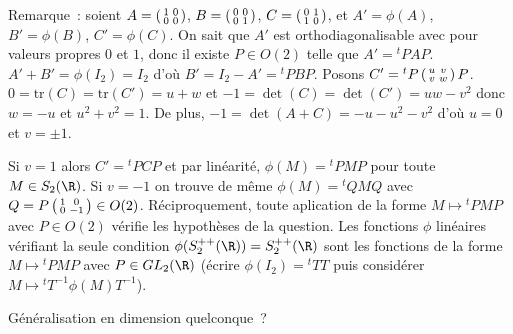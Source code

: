 {\begin{enumerate}
{    Remarque~: soient $A = \left(\begin{smallmatrix}1&0\cr0&0\cr\end{smallmatrix}\right)$,
                      $B = \left(\begin{smallmatrix}0&0\cr0&1\cr\end{smallmatrix}\right)$,
                      $C = \left(\begin{smallmatrix}0&1\cr1&0\cr\end{smallmatrix}\right)$,
    et $A'=\phi(A)$, $B'=\phi(B)$, $C'=\phi(C)$. On sait que $A'$ est
    orthodiagonalisable avec pour valeurs propres $0$ et $1$, donc il existe
    $P\in O(2)$ telle que $A' = {}^tPAP$. $A'+B'=\phi(I_2)=I_2$ d'où
    $B' = I_2-A' = {}^tPBP$. Posons $C' = {}^tP\left(\begin{smallmatrix}u&v\cr v&w\cr\end{smallmatrix}\right)P$.
    $0=\mathrm{tr}(C) = \mathrm{tr}(C') = u+w$ et $-1=\det(C) = \det(C') = uw-v^2$
    donc $w=-u$ et $u^2+v^2=1$. De plus,
    $-1=\det(A+C) = -u-u^2-v^2$ d'où $u=0$ et $v=\pm 1$.
    
    Si $v=1$ alors $C' = {}^tPCP$ et par linéarité, $\phi(M)={}^tPMP$
    pour toute $M\in S_2(\R)$.
    Si $v=-1$ on trouve de même $\phi(M) = {}^tQMQ$ avec $Q=P\left(\begin{smallmatrix}1&0\cr0&-1\cr\end{smallmatrix}\right)\in O(2)$.
    Réciproquement, toute aplication de la forme $M  \mapsto{}^tPMP$ avec $P\in O(2)$
    vérifie les hypothèses de la question. Les fonctions $\phi$
    linéaires vérifiant la seule condition $\phi(S_2^{++}(\R)) = S_2^{++}(\R)$
    sont les fonctions de la forme $M \mapsto{}^tPMP$ avec $P\in GL_2(\R)$
    (écrire $\phi(I_2) = {}^tTT$ puis considérer $M \mapsto{}^tT^{-1}\phi(M)T^{-1}$).
    
    Généralisation en dimension quelconque~?}
\end{enumerate}
}
